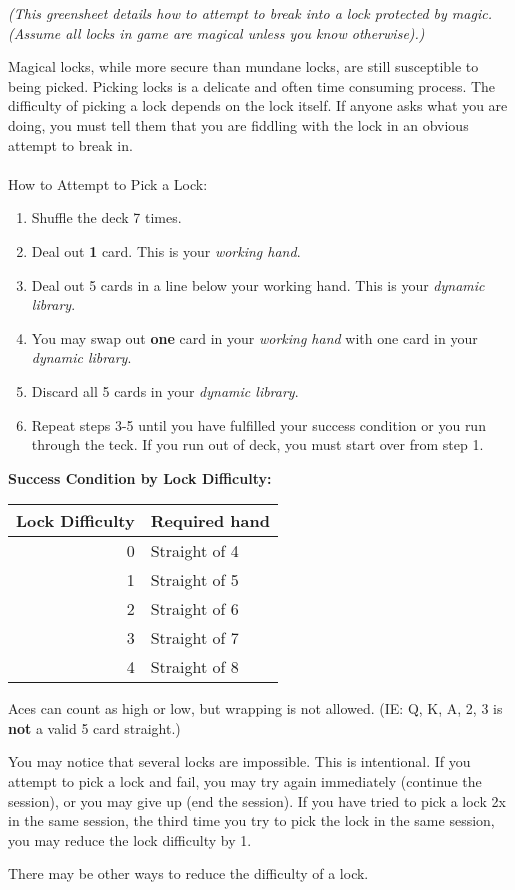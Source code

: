 \documentclass[green]{NeptuneBall}
\begin{document}
\name{\gDecking{}}

\emph{(This greensheet details how to attempt to break into a lock protected by magic. (Assume all locks in game are magical unless you know otherwise).)}

Magical locks, while more secure than mundane locks, are still susceptible to being picked. Picking locks is a delicate and often time consuming process. The difficulty of picking a lock depends on the lock itself. If anyone asks what you are doing, you must tell them that you are fiddling with the lock in an obvious attempt to break in.\\ \\

How to Attempt to Pick a Lock:
\begin{enumerate}
	\item Shuffle the deck 7 times.
	\item Deal out {\bf 1} card. This is your {\em working hand}.
	\item Deal out 5 cards in a line below your working hand. This is your {\em dynamic library}.
	\item You may swap out {\bf one} card in your {\em working hand} with one card in your {\em dynamic library}.
	\item Discard all 5 cards in your {\em dynamic library}.
	\item Repeat steps 3-5 until you have fulfilled your success condition or you run through the teck.  If you run out of deck, you must start over from step 1.
\end{enumerate}

{\bf Success Condition by Lock Difficulty:}\\
\begin{tabular}{||r|l||}
\hline\hline
Lock Difficulty	& Required hand\\
\hline
0	& Straight of 4\\
1	& Straight of 5\\
2	& Straight of 6\\
3	& Straight of 7\\
4	& Straight of 8\\
\hline\hline 
\end{tabular}

\vspace{10 mm}

Aces can count as high or low, but wrapping is not allowed. (IE: Q, K, A, 2, 3 is {\bf not} a valid 5 card straight.)

You may notice that several locks are impossible. This is intentional. If you attempt to pick a lock and fail, you may try again immediately (continue the session), or you may give up (end the session). If you have tried to pick a lock 2x in the same session, the third time you try to pick the lock in the same session, you may reduce the lock difficulty by 1.

There may be other ways to reduce the difficulty of a lock.
\end{document}
